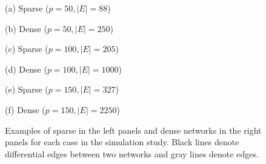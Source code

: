 \documentclass[useAMS,usenatbib,referee]{bio}
\begin{document}
{\begin{figure}[htb!] %
\begin{center} \medskip
\begin{minipage}[b]{.45\linewidth}
  \centering   \centerline{}
  \centerline{(a) Sparse ($p=50, |E| = 88$)} \medskip
  \end{minipage} \medskip
\begin{minipage}[b]{.45\linewidth}
  \centering   \centerline{}
  \centerline{(b) Dense ($p=50, |E| = 250$) } \medskip
\end{minipage}
\begin{minipage}[b]{.45\linewidth}
  \centering   \centerline{}
  \centerline{(c) Sparse ($p=100, |E| = 205$)} \medskip
\end{minipage}
\begin{minipage}[b]{.45\linewidth}
  \centering   \centerline{}
  \centerline{(d) Dense  ($p=100, |E| = 1000$)} \medskip
\end{minipage}
\begin{minipage}[b]{.45\linewidth}
  \centering   \centerline{}
  \centerline{(e) Sparse ($p=150, |E| = 327$) } \medskip
\end{minipage}
\begin{minipage}[b]{.45\linewidth}
  \centering   \centerline{}
  \centerline{(f) Dense  ($p=150, |E| = 2250$)} \medskip
\end{minipage}
\caption{Examples of sparse in the left panels and dense networks 
in the right panels for each case in the simulation study.
Black lines denote differential edges between two networks and 
gray lines denote edges.}
\end{center}
\end{figure}


}
\end{document}

